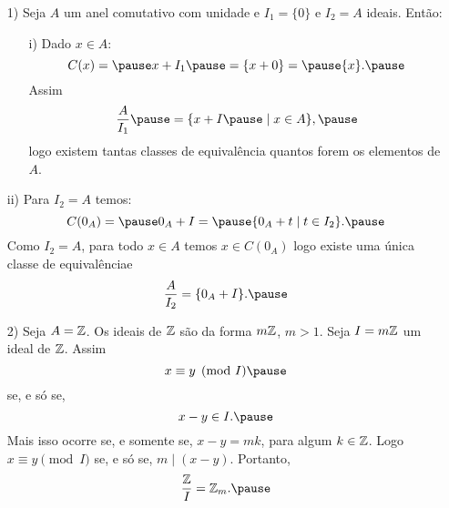 \documentclass{beamer}
\begin{document}
    \begin{frame}
        \begin{exemplos}
            \begin{enumerate}
                \item[1)] Seja $A$ um anel comutativo com unidade \pause e $I_{1} = \{0\}$ \pause e $I_{2} = A$ ideais. \pause Ent\~ao:\pause
                \begin{enumerate}
                    \item[i)] Dado $x \in A$:\pause
                    \[
                        C(x) = \pause x + I_{1} \pause = \{x + 0\} = \pause \{x\}.\pause
                    \]
                    Assim
                    \[
                        \dfrac{A}{I_{1}} \pause = \{x + I \pause \mid x \in A\},\pause
                    \]
                    logo existem tantas classes de equival{\^e}ncia \pause quantos forem os elementos de $A$.\pause
                \end{enumerate}
            \end{enumerate}
        \end{exemplos}
    \end{frame}

    \begin{frame}
        \begin{exemplos}
            \begin{enumerate}
                \item[ii)] Para $I_{2} = A$ \pause temos:
                \[
                    C(0_A) = \pause 0_A + I = \pause \{0_A + t \mid t \in I_{2}\}.\pause
                \]
                Como $I_2 = A$, \pause para todo $x \in A$ \pause temos $x \in C(0_A)$ \pause logo existe uma \'unica \pause classe de equival\^encia\pause e
                \[
                    \dfrac{A}{I_{2}} = \{0_{A} + I\}.\pause
                \]
            \end{enumerate}
        \end{exemplos}
    \end{frame}

    \begin{frame}
        \begin{exemplos}
            \begin{enumerate}
                \item[2)] Seja $A = \mathbb{Z}$. \pause Os ideais de $\mathbb{Z}$ \pause s{\~a}o da forma $m\mathbb{Z}$, \pause $m > 1$. \pause Seja $I = m\mathbb{Z}$ \pause um ideal de $\mathbb{Z}$. \pause Assim\pause
                \[
                    x\equiv y \pmod I\pause
                \]
                se, e s\'o se,
                \[
                    x - y \in I.\pause
                \]
                Mais isso ocorre \pause se, e somente se, \pause $x - y = mk $, \pause para algum $k \in \mathbb{Z}$. \pause Logo $x\equiv y \pmod I$ \pause se, e s\'o se, \pause $m\mid (x - y)$. \pause  Portanto,
                \[
                    \dfrac{\z}{I} = \z_m.\pause
                \]
            \end{enumerate}
        \end{exemplos}
    \end{frame}
\end{document}
